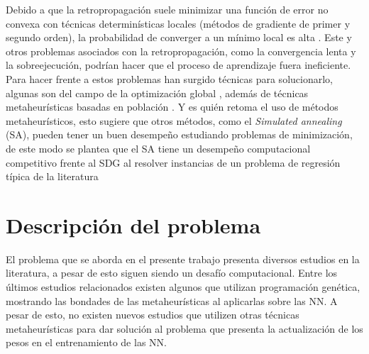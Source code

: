 Debido a que la retropropagación suele minimizar una función de error no convexa con técnicas determinísticas locales (métodos de gradiente de primer y segundo orden), la probabilidad de converger a un mínimo local es alta \cite{Bianchini1996, Bishop1995, Battiti1995}. Este y otros problemas asociados con la retropropagación, como la convergencia lenta y la sobreejecución, podrían hacer que el proceso de aprendizaje fuera ineficiente. Para hacer frente a estos problemas han surgido técnicas para solucionarlo, algunas son del campo de la optimización global \cite{Battiti1995, Tsai2006, Rocha2003, Chelouah2000, Zheng2005}, además de técnicas metaheurísticas basadas en población \cite{Lamos2012}. Y es  quién retoma el uso de métodos metaheurísticos, esto sugiere que otros métodos, como el {\em Simulated annealing} (SA), pueden tener un buen desempeño estudiando problemas de minimización, de este modo se plantea que el SA tiene un desempeño computacional competitivo frente al SDG al resolver instancias de un problema de regresión típica de la literatura

















\section{Descripción del problema}
El problema que se aborda en el presente trabajo presenta diversos estudios en la literatura, a pesar de esto siguen siendo un desafío computacional. Entre los últimos estudios relacionados existen algunos que utilizan programación genética, mostrando las bondades de las metaheurísticas al aplicarlas sobre las NN. A pesar de esto, no existen nuevos estudios que utilizen otras técnicas metaheurísticas para dar solución al problema que presenta la actualización de los pesos en el entrenamiento de las NN.

